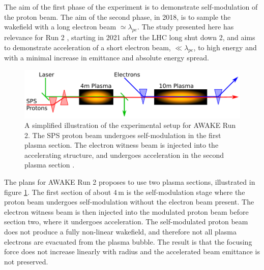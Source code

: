 \documentclass[aps,prstab,reprint,amsmath,amssymb,groupedaddress]{revtex4-1}
\newcommand{\unit}[1]{\,\mathrm{#1}}
\begin{document}
The aim of the first phase of the experiment is to demonstrate self-modulation of the proton beam. The aim of the second
phase, in 2018, is to sample the wakefield with a long electron beam $\simeq\lambda_{pe}$. The study presented here has
relevance for Run 2 \cite{adli:2016}, starting in 2021 after the LHC long shut down 2, and aims to demonstrate
acceleration of a short electron beam, $\ll\lambda_{pe}$, to high energy and with a minimal increase in emittance and
absolute energy spread.

\begin{figure}[hbt]
    \includegraphics[width=0.99\linewidth,trim={1mm 2mm 1mm 2mm},clip]{figures/figAWAKE}
    \caption{\label{Fig:AWAKER2} A simplified illustration of the experimental setup for AWAKE Run 2. The SPS proton
        beam undergoes self-modulation in the first plasma section. The electron witness beam is injected into the
        accelerating structure, and undergoes acceleration in the second plasma section
        \cite{berglyd_olsen:2015, adli:2016}.}
\end{figure}

The plans for AWAKE Run 2 proposes to use two plasma sections, illustrated in figure \ref{Fig:AWAKER2}. The first
section of about $4\unit{m}$ is the self-modulation stage where the proton beam undergoes self-modulation without the
electron beam present. The electron witness beam is then injected into the modulated proton beam before section two,
where it undergoes acceleration. The self-modulated proton beam does not produce a fully non-linear wakefield, and
therefore not all plasma electrons are evacuated from the plasma bubble. The result is that the focusing force does not
increase linearly with radius and the accelerated beam emittance is not preserved. 

\end{document}
